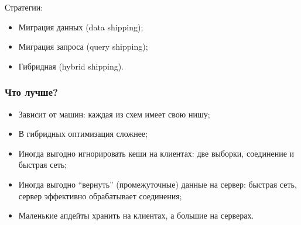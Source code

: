 \documentclass{beamer}
\begin{document}
\begin{frame}
Стратегии:
\begin{itemize}
  \setlength\itemsep{1em}

  \item Миграция данных (data shipping);
  \item Миграция запроса (query shipping);
  \item Гибридная (hybrid shipping).
\end{itemize}
\end{frame}


\begin{frame}
\frametitle{Что лучше?}

\begin{itemize}
  \setlength\itemsep{1em}

  \item Зависит от машин: каждая из схем имеет свою нишу;
  \item В гибридных оптимизация сложнее;
  \item Иногда выгодно игнорировать кеши на клиентах: две выборки, соединение и быстрая сеть;
  \item Иногда выгодно ``вернуть'' (промежуточные) данные на сервер: быстрая сеть, сервер эффективно обрабатывает соединения;
  \item Маленькие апдейты хранить на клиентах, а большие на серверах.
\end{itemize}
\end{frame}

\end{document}

